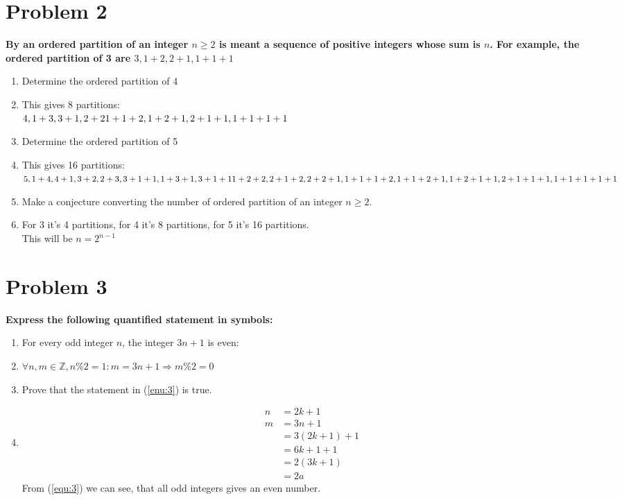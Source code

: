 \documentclass[english,11pt,a4paper]{article}
\begin{document}
\section*{Problem 2}
\textbf{By an ordered partition of an integer $n \geq 2$ is meant a sequence of positive integers whose sum is $n$. For example, the ordered partition of 3 are $3,1+2,2+1,1+1+1$}
\begin{enumerate}[a]
\item Determine the ordered partition of 4
\item[] This gives 8 partitions:\\
$4, \\
1+3, 3+1, \\
2+2\\
1+1+2, 1+2+1, 2+1+1, \\
1+1+1+1$
\item Determine the ordered partition of 5
\item[] This gives 16 partitions: \\
$5, \\
1+4,4+1,\\
3+2,2+3,\\
3+1+1,1+3+1,3+1+1\\
1+2+2,2+1+2,2+2+1,\\
1+1+1+2,1+1+2+1,1+2+1+1,2+1+1+1,\\
1+1+1+1+1$
\item Make a conjecture converting the number of ordered partition of an integer $n\geq 2$.
\item[] For 3 it's 4 partitions, for 4 it's 8 partitions, for 5 it's 16 partitions.\\
This will be $n=2^{n-1}$
\end{enumerate}




\section*{Problem 3}
\textbf{Express the following quantified statement in symbols:}
\begin{enumerate}[a]
\item \label{enu:3}For every odd integer $n$, the integer $3n+1$ is even:
\item[]$\forall n, m \in \mathbb{Z}, n\%2 = 1: m = 3n+1 \Rightarrow m\%2=0$
\item Prove that the statement in (\ref{enu:3}) is true.
\item[] 
\begin{align}
n &= 2k+1\\
m &= 3n+1\\
	&=3(2k+1)+1\\
	&=6k+1+1\\
	&=2(3k+1)\\
	&=2a\label{equ:3}
\end{align}
From (\ref{equ:3}) we can see, that all odd integers gives an even number.
\end{enumerate}
\end{document}

